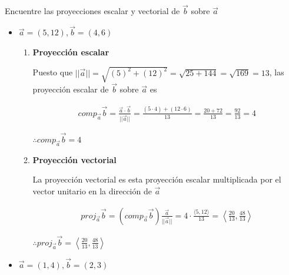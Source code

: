 \documentclass[12pt]{article}
\begin{document}
\section{}

Encuentre las proyecciones escalar y vectorial de $\vec{b}$ sobre $\vec{a}$

\begin{itemize}
  
\item $\vec{a}= (5,12), \vec{b}=(4,6)$

  \begin{enumerate}[format=\textbf]

  \item \textbf{Proyección escalar}

    Puesto que $||\vec{a}|| = \sqrt{(5)^2 + (12)^2} = \sqrt{25 + 144} = \sqrt{169} = 13$, las proyección escalar de $\vec{b}$ sobre $\vec{a}$ es

    \begin{align*}
      comp_{\vec{a}}\vec{b}
      = \frac{\vec{a} \cdot \vec{b}}{||\vec{a}||}
      = \frac{(5 \cdot 4) + (12 \cdot 6)}{13}
      = \frac{20 + 72}{13}
      = \frac{92}{13}
      = 4
    \end{align*}

    $\therefore comp_{\vec{a}}\vec{b} = 4$

  \item \textbf{Proyección vectorial}

    La proyección vectorial es esta proyección escalar multiplicada por el vector unitario en la dirección de $\vec{a}$

    \begin{align*}
      proj_{\vec{a}}\vec{b}
      = \left( comp_{\vec{a}}\vec{b} \right) \frac{\vec{a}}{||\vec{a}||}
      = 4 \cdot \frac{\langle 5, 12 \rangle}{13}
      = \left\langle \frac{20}{13}, \frac{48}{13} \right\rangle
    \end{align*}

    $\therefore proj_{\vec{a}}\vec{b} = \left\langle \frac{20}{13}, \frac{48}{13} \right\rangle$
    
  \end{enumerate}
  
\item $\vec{a}= (1,4), \vec{b}=(2,3)$

  \begin{enumerate}[format=\textbf]


\end{enumerate}
\end{itemize}
\end{document}

